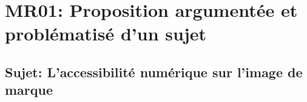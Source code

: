 \documentclass[12pt, a4paper]{report}
\begin{document}
\tahomafont


\topmargin -1.5cm
\pagestyle{fancy}
\fancyhf{}
\fancyhead[R]{\thepage}
\renewcommand{\headrulewidth}{1pt}


\chapter*{MR01: Proposition argumentée et problématisé d'un sujet}
\section*{Sujet: L'accessibilité numérique sur l'image de marque}
\end{document}

